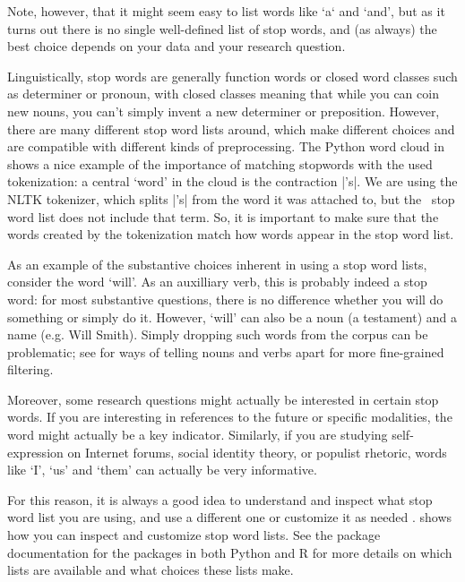 
Note, however, that it might seem easy to list words like `a` and `and',
but as it turns out there is no single well-defined list of stop words,
and (as always) the best choice depends on your data and your research question.

Linguistically, stop words are generally function words or closed word classes such as determiner or pronoun,
with closed classes meaning that while you can coin new nouns, you can't simply invent a new determiner or preposition.
However, there are many different stop word lists around, which make different choices and are compatible with
different kinds of preprocessing.
The Python word cloud in  shows a nice example of the importance of matching stopwords with the used
tokenization: a central `word' in the cloud is the contraction |'s|.
We are using the NLTK tokenizer, which splits |'s| from the word it was attached to, but the \sklearn\ stop word list
does not include that term.
So, it is important to make sure that the words created by the tokenization match how words appear in the stop word list.

As an example of the substantive choices inherent in using a stop word lists,
consider the word `will'.
As an auxilliary verb, this is probably indeed a stop word: for most substantive questions, there is no difference
whether you will do something or simply do it.
However, `will' can also be a noun (a testament) and a name (e.g. Will Smith).
Simply dropping such words from the corpus can be problematic; see  for ways of telling nouns and verbs apart
for more fine-grained filtering.

Moreover, some research questions might actually be interested in certain stop words.
If you are interesting in references to the future or specific modalities,
the word might actually be a key indicator. 
Similarly, if you are studying self-expression on Internet forums, social identity theory, or populist rhetoric,
words like `I', `us' and `them' can actually be very informative.

For this reason, it is always a good idea to understand and inspect what stop word list you are using,
and use a different one or customize it as needed \citep[see also][]{nothman18}.
 shows how you can inspect and customize stop word lists.
See the package documentation for the  packages in both Python and R
for more details on which lists are available and what choices these lists make. 

